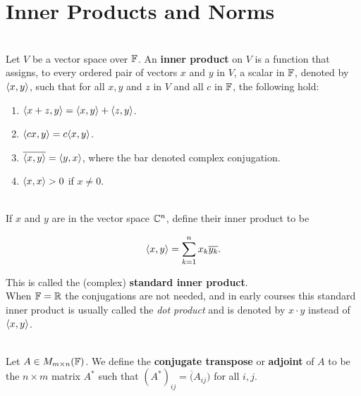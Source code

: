 \section{Inner Products and Norms}

\begin{definition}
	\hfill\\
	Let $V$ be a vector space over $\mathbb{F}$. An \textbf{inner product} on $V$ is a function that assigns, to every ordered pair of vectors $x$ and $y$ in $V$, a scalar in $\mathbb{F}$, denoted by $\langle x, y\rangle$, such that for all $x, y$ and $z$ in $V$ and all $c$ in $\mathbb{F}$, the following hold:

	\begin{enumerate}
		\item $\langle x + z, y\rangle = \langle x, y\rangle + \langle z,y\rangle$.
		\item $\langle cx, y\rangle = c\langle x,y\rangle$.
		\item $\overline{\langle x,y\rangle} = \langle y,x\rangle$, where the bar denoted complex conjugation.
		\item $\langle x, x\rangle > 0$ if $x \neq 0$.
	\end{enumerate}
\end{definition}

\begin{definition}\label{Definition 6.2}
	\hfill\\
	If $x$ and $y$ are in the vector space $\mathbb{C}^n$, define their inner product to be

	\[\langle x,y\rangle = \sum_{k=1}^{n}x_k\overline{y_k}.\]

	This is called the (complex) \textbf{standard inner product}.\\

	When $\mathbb{F} = \mathbb{R}$ the conjugations are not needed, and in early courses this standard inner product is usually called the \textit{dot product} and is denoted by $x \cdot y$ instead of $\langle x, y\rangle$.
\end{definition}

\begin{definition}\label{Conjugate Transpose}
	\hfill\\
	Let $A \in M_{m \times n}(\mathbb{F})$. We define the \textbf{conjugate transpose} or \textbf{adjoint} of $A$ to be the $n \times m$ matrix $A^*$ such that $(A^*)_{ij} = \overline(A_{ij})$ for all $i,j$.
\end{definition}

